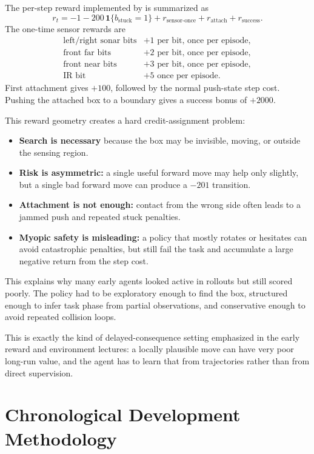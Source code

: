 \documentclass[11pt]{article}
\begin{document}
The per-step reward implemented by  is summarized as
\[
  r_t =
  -1
  - 200\,\mathbf{1}\{b_{\text{stuck}}=1\}
  + r_{\text{sensor-once}}
  + r_{\text{attach}}
  + r_{\text{success}}.
\]
The one-time sensor rewards are
\[
\begin{array}{ll}
\text{left/right sonar bits} & +1 \text{ per bit, once per episode},\\
\text{front far bits}       & +2 \text{ per bit, once per episode},\\
\text{front near bits}      & +3 \text{ per bit, once per episode},\\
\text{IR bit}               & +5 \text{ once per episode}.
\end{array}
\]
First attachment gives \(+100\), followed by the normal push-state step cost. Pushing
the attached box to a boundary gives a success bonus of \(+2000\).

This reward geometry creates a hard credit-assignment problem:
\begin{itemize}[leftmargin=1.5em]
  \item \textbf{Search is necessary} because the box may be invisible, moving, or outside
  the sensing region.
  \item \textbf{Risk is asymmetric:} a single useful forward move may help only slightly,
  but a single bad forward move can produce a \(-201\) transition.
  \item \textbf{Attachment is not enough:} contact from the wrong side often leads to a
  jammed push and repeated stuck penalties.
  \item \textbf{Myopic safety is misleading:} a policy that mostly rotates or hesitates can
  avoid catastrophic penalties, but still fail the task and accumulate a large negative
  return from the step cost.
\end{itemize}

This explains why many early agents looked active in rollouts but still scored poorly.
The policy had to be exploratory enough to find the box, structured enough to infer task
phase from partial observations, and conservative enough to avoid repeated collision
loops.

This is exactly the kind of delayed-consequence setting emphasized in the early reward
and environment lectures: a locally plausible move can have very poor long-run value, and
the agent has to learn that from trajectories rather than from direct supervision.

\section{Chronological Development Methodology}
\end{document}
